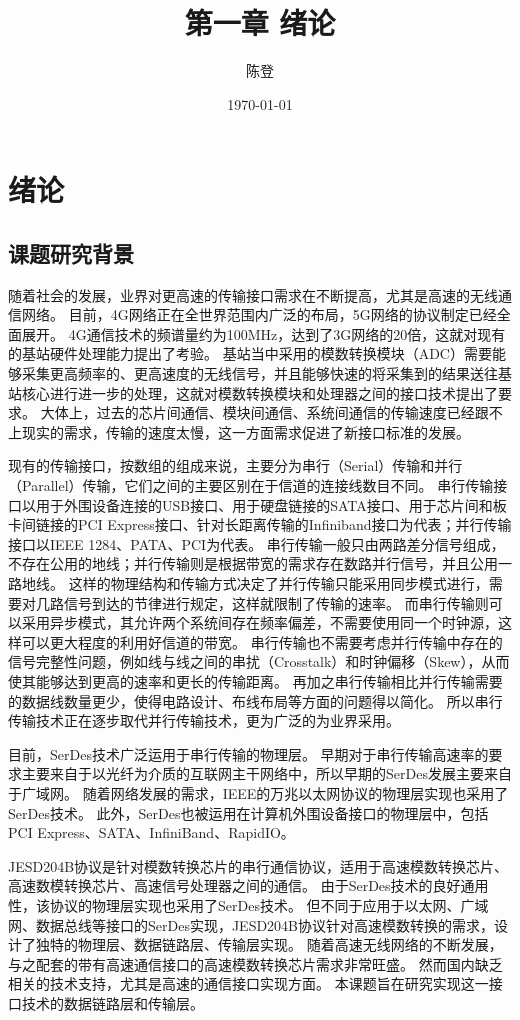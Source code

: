 \documentclass[UTF8]{ctexart}
\title{第一章 绪论}
\author{陈登}
\date{\today}
\begin{document}
\section{绪论}

\subsection{课题研究背景}

随着社会的发展，业界对更高速的传输接口需求在不断提高，尤其是高速的无线通信网络。
目前，4G网络正在全世界范围内广泛的布局，5G网络的协议制定已经全面展开。
4G通信技术的频谱量约为100MHz，达到了3G网络的20倍\cite{zhangxw2013}，这就对现有的基站硬件处理能力提出了考验。
基站当中采用的模数转换模块（ADC）需要能够采集更高频率的、更高速度的无线信号，并且能够快速的将采集到的结果送往基站核心进行进一步的处理，这就对模数转换模块和处理器之间的接口技术提出了要求。
大体上，过去的芯片间通信、模块间通信、系统间通信的传输速度已经跟不上现实的需求，传输的速度太慢，这一方面需求促进了新接口标准的发展。

现有的传输接口，按数组的组成来说，主要分为串行（Serial）传输和并行（Parallel）传输，它们之间的主要区别在于信道的连接线数目不同。
串行传输接口以用于外围设备连接的USB接口、用于硬盘链接的SATA接口、用于芯片间和板卡间链接的PCI Express接口、针对长距离传输的Infiniband接口为代表；并行传输接口以IEEE 1284、PATA、PCI为代表。
串行传输一般只由两路差分信号组成，不存在公用的地线；并行传输则是根据带宽的需求存在数路并行信号，并且公用一路地线。
这样的物理结构和传输方式决定了并行传输只能采用同步模式进行，需要对几路信号到达的节律进行规定，这样就限制了传输的速率。
而串行传输则可以采用异步模式，其允许两个系统间存在频率偏差，不需要使用同一个时钟源，这样可以更大程度的利用好信道的带宽。
串行传输也不需要考虑并行传输中存在的信号完整性问题，例如线与线之间的串扰（Crosstalk）和时钟偏移（Skew），从而使其能够达到更高的速率和更长的传输距离。
再加之串行传输相比并行传输需要的数据线数量更少，使得电路设计、布线布局等方面的问题得以简化。
所以串行传输技术正在逐步取代并行传输技术，更为广泛的为业界采用。

目前，SerDes技术广泛运用于串行传输的物理层。
早期对于串行传输高速率的要求主要来自于以光纤为介质的互联网主干网络中，所以早期的SerDes发展主要来自于广域网。
随着网络发展的需求，IEEE的万兆以太网协议的物理层实现也采用了SerDes技术。
此外，SerDes也被运用在计算机外围设备接口的物理层中，包括PCI Express、SATA、InfiniBand、RapidIO。

JESD204B协议是针对模数转换芯片的串行通信协议，适用于高速模数转换芯片、高速数模转换芯片、高速信号处理器之间的通信。
由于SerDes技术的良好通用性，该协议的物理层实现也采用了SerDes技术。
但不同于应用于以太网、广域网、数据总线等接口的SerDes实现，JESD204B协议针对高速模数转换的需求，设计了独特的物理层、数据链路层、传输层实现。
随着高速无线网络的不断发展，与之配套的带有高速通信接口的高速模数转换芯片需求非常旺盛。
然而国内缺乏相关的技术支持，尤其是高速的通信接口实现方面。
本课题旨在研究实现这一接口技术的数据链路层和传输层。
\end{document}
